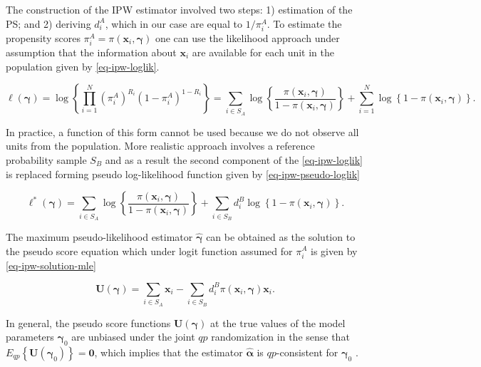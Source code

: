 \documentclass[
]{jss}
\begin{document}
The construction of the IPW estimator involved two steps: 1) estimation
of the PS; and 2) deriving \(d_i^A\), which in our case are equal to
\(1/\pi_i^A\). To estimate the propensity scores
\(\pi_i^A=\pi(\boldsymbol{x}_i, \boldsymbol{\gamma})\) one can use the
likelihood approach under assumption that the information about
\(\boldsymbol{x}_i\) are available for each unit in the population given
by \eqref{eq-ipw-loglik}.

\begin{equation}
\ell(\boldsymbol{\gamma}) = \log\left\{\prod_{i=1}^N \left(\pi_i^A\right)^{R_i}\left(1-\pi_i^A\right)^{1-R_i}\right\} =
\sum_{i \in S_{A}} \log \left\{\frac{\pi\left(\boldsymbol{x}_i, \boldsymbol{\gamma}\right)}{1-\pi\left(\boldsymbol{x}_i, \boldsymbol{\gamma}\right)}\right\}+\sum_{i=1}^N \log \left\{1-\pi\left(\boldsymbol{x}_i, \boldsymbol{\gamma}\right)\right\}.
\label{eq-ipw-loglik}
\end{equation}

In practice, a function of this form cannot be used because we do not
observe all units from the population. More realistic approach involves
a reference probability sample \(S_B\) and as a result the second
component of the \eqref{eq-ipw-loglik} is replaced forming pseudo
log-likelihood function given by \eqref{eq-ipw-pseudo-loglik}

\begin{equation}
\ell^*(\boldsymbol{\gamma}) = \sum_{i \in S_{A}} \log \left\{\frac{\pi\left(\boldsymbol{x}_i, \boldsymbol{\gamma}\right)}{1-\pi\left(\boldsymbol{x}_i, \boldsymbol{\gamma}\right)}\right\}+ \sum_{i \in S_{B}} d_i^B \log \left\{1-\pi\left(\boldsymbol{x}_i, \boldsymbol{\gamma}\right)\right\}.
\label{eq-ipw-pseudo-loglik}
\end{equation}

The maximum pseudo-likelihood estimator \(\hat{\boldsymbol{\gamma}}\)
can be obtained as the solution to the pseudo score equation which under
logit function assumed for \(\pi_i^A\) is given by
\eqref{eq-ipw-solution-mle}

\begin{equation}
\boldsymbol{U}(\boldsymbol{\gamma}) = \sum_{i \in S_A} \boldsymbol{x}_i - \sum_{i \in S_B} d_i^B \pi(\boldsymbol{x}_i, \boldsymbol{\gamma}) \boldsymbol{x}_i.
\label{eq-ipw-solution-mle}
\end{equation}

In general, the pseudo score functions
\(\boldsymbol{U}(\boldsymbol{\gamma})\) at the true values of the model
parameters \(\boldsymbol{\gamma}_0\) are unbiased under the joint
\(q p\) randomization in the sense that
\(E_{q p}\left\{\boldsymbol{U}\left(\boldsymbol{\gamma}_0\right)\right\}=\boldsymbol{0}\),
which implies that the estimator \(\hat{\boldsymbol{\alpha}}\) is
\(qp\)-consistent for \(\boldsymbol{\gamma}_0\)
\citep{wu2022statistical}.
\end{document}
